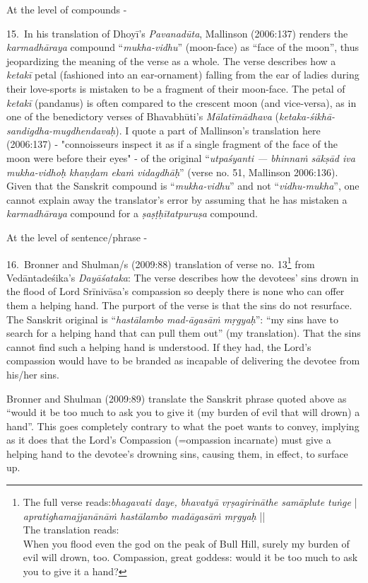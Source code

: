 At the level of compounds -

15.~In his translation of Dhoyī’s \textsl{Pavanadūta}, Mallinson (2006:137) renders the \textsl{karmadhāraya} compound “\textsl{mukha-vidhu}” (moon-face) as “face of the moon”, thus jeopardizing the meaning of the verse as a whole. The verse describes how a \textsl{ketakī} petal (fashioned into an ear-ornament) falling from the ear of ladies during their love-sports is mistaken to be a fragment of their moon-face. The petal of \textsl{ketakī} (pandanus) is often compared to the crescent moon (and vice-versa), as in one of the benedictory verses of Bhavabhūti’s \textsl{Mālatīmādhava} (\textsl{ketaka-śikhā-sandigdha-mugdhendavaḥ}). I quote a part of Mallinson's translation here (2006:137) - "connoisseurs inspect it as if a single fragment of the face of the moon were before their eyes" - of the original “\textsl{utpaśyanti --- bhinnaṁ sākṣād iva mukha-vidhoḥ khaṇḍam ekaṁ vidagdhāḥ}” (verse no. 51, Mallinson 2006:136). Given that the Sanskrit compound is “\textsl{mukha-vidhu}” and not “\textsl{vidhu-mukha}”, one cannot explain away the translator’s error by assuming that he has mistaken a \textsl{karmadhāraya} compound for a \textsl{ṣaṣṭḥītatpuruṣa} compound. 

At the level of sentence/phrase - 

16.~Bronner and Shulman/s (2009:88) translation of verse no. 13\footnote[10]{The full verse reads:\textsl{bhagavati daye, bhavatyā vṛṣagirināthe samāplute tuṅge} |\\
\textsl{apratighamajjanānāṁ hastālambo madāgasāṁ mṛgyaḥ} ||\\
The translation reads:\\
When you flood even the god on the peak of Bull Hill, surely my burden of evil will drown, too. Compassion, great goddess: would it be too much to ask you to give it a hand?} from Vedāntadeśika’s \textsl{Dayāśataka}: The verse describes how the devotees’ sins drown in the flood of Lord Srīnivāsa’s compassion so deeply there is none who can offer them a helping hand. The purport of the verse is that the sins do not resurface. The Sanskrit original is “\textsl{hastālambo mad-āgasāṁ mṛgyaḥ}”: “my sins have to search for a helping hand that can pull them out” (my translation). That the sins cannot find such a helping hand is understood. If they had, the Lord’s compassion would have to be branded as incapable of delivering the devotee from his/her sins.

Bronner and Shulman (2009:89) translate the Sanskrit phrase quoted above as “would it be too much to ask you to give it (my burden of evil that will drown) a hand”. This goes completely contrary to what the poet wants to convey, implying as it does that the Lord’s Compassion (=ompassion incarnate) must give a helping hand to the devotee’s drowning sins, causing them, in effect, to surface up. 

